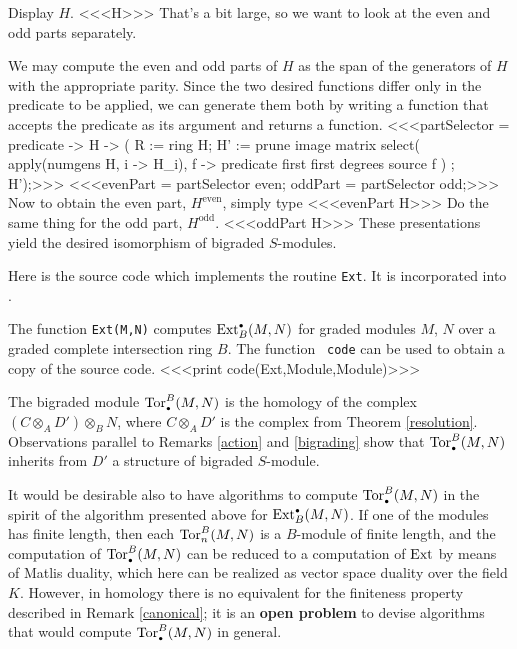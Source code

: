\begin{Example}
Display $H$.
<<<H>>>
That's a bit large, so we want to look at the even and odd parts separately.

We may compute the even and odd parts of $H$ as the span of the
generators of $H$ with the appropriate parity.  Since the two desired
functions differ only in the predicate to be applied, we can generate
them both by writing a function that accepts the predicate as its
argument and returns a function.
<<<partSelector = predicate -> H -> (
   R := ring H;
   H' := prune image matrix {
       select(
           apply(numgens H, i -> H_{i}),
           f -> predicate first first degrees source f
           )
       };
   H');>>>
<<<evenPart = partSelector even; oddPart = partSelector odd;>>>
Now to obtain the even part, $H^{\text{even}}$, simply type
<<<evenPart H>>>
Do the same thing for the odd part, $H^{\text{odd}}$.
<<<oddPart H>>>
These presentations yield the desired isomorphism of bigraded $S$-modules.
 \end{Example}

Here is the source code which implements the routine {\tt Ext}.  It is
incorporated into \Mtwo.

\begin{code}
\label{master}
The function {\tt Ext(M,N)} computes $\operatorname{Ext}_B^{\scriptscriptstyle\bullet}(M,N)$ for graded modules
$M$, $N$ over a graded complete intersection ring $B$.  The function {\tt
  code} can be used to obtain a copy of the source code.
<<<print code(Ext,Module,Module)>>>
\end{code}

\begin{Remark}
The bigraded module $\operatorname{Tor}_{\scriptscriptstyle\bullet}^B(M,N)$ is the homology of the complex
$(C \otimes_A D') \otimes_B N$, where $C\otimes_A D'$ is the complex
from Theorem \ref{resolution}.  Observations parallel to Remarks
\ref{action} and \ref{bigrading} show that $\operatorname{Tor}_{\scriptscriptstyle\bullet}^B(M,N)$ inherits
from $D'$ a structure of bigraded $S$-module.

It would be desirable also to have algorithms to compute
$\operatorname{Tor}_{\scriptscriptstyle\bullet}^B(M,N)$ in the spirit of the algorithm presented above for
$\operatorname{Ext}^{\scriptscriptstyle\bullet}_B(M,N)$.  If one of the modules has finite length, then
each $\operatorname{Tor}_n^B(M,N)$ is a $B$-module of finite length, and the
computation of $\operatorname{Tor}_{\scriptscriptstyle\bullet}^B(M,N)$ can be reduced to a computation of
$\operatorname{Ext}$ by means of Matlis duality, which here can be realized as vector
space duality over the field $K$.  However, in homology there is no
equivalent for the finiteness property described in Remark
\ref{canonical}; it is an {\bf open problem} to devise algorithms that
would compute $\operatorname{Tor}_{\scriptscriptstyle\bullet}^B(M,N)$ in general.
 \end{Remark}

